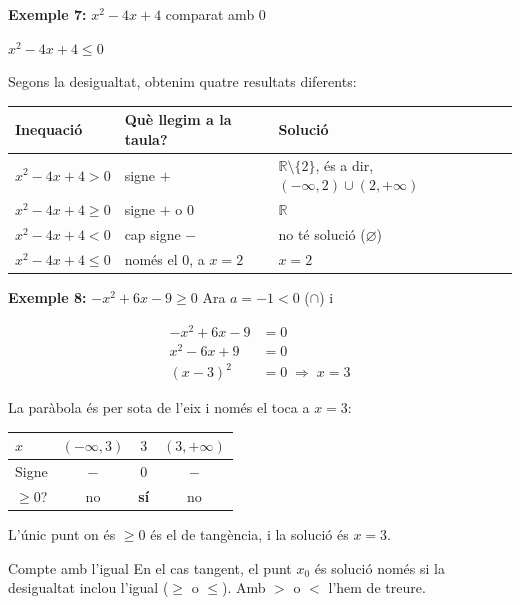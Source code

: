 \begin{exemple}{\textbf{Exemple 7:} $x^2-4x+4$ comparat amb $0$}
\begin{center}
\begin{minipage}[t]{0.48\linewidth}
$x^2-4x+4\leq 0$
\end{minipage}
\end{center}

Segons la desigualtat, obtenim quatre resultats diferents:

\begin{center}
\begin{tabular}{lll}
\toprule
\textbf{Inequació} & \textbf{Què llegim a la taula?} & \textbf{Solució} \\
\midrule
${x^2-4x+4>0}$ & signe $+$ & ${\mathbb{R}\setminus\{2\}}$, és a dir, $(-\infty,2)\cup(2,+\infty)$ \\
${x^2-4x+4\geq 0}$ & signe $+$ o $0$ & $\mathbb{R}$ \\
${x^2-4x+4<0}$ & cap signe $-$ & no té solució ($\varnothing$) \\
${x^2-4x+4\leq 0}$ & només el $0$, a $x=2$ & $x=2$ \\
\bottomrule
\end{tabular}
\end{center}
\end{exemple}

\begin{exemple}{\textbf{Exemple 8:} $-x^2+6x-9\geq 0$}
Ara $a=-1<0$ ($\cap$) i

\[
\begin{aligned}
-x^2+6x-9&=0\\
x^2-6x+9&=0\\
(x-3)^2&=0 \;\Rightarrow\; x=3
\end{aligned}
\]

La paràbola és per sota de l'eix i només el toca a $x=3$:

\begin{center}
\begin{tabular}{lccc}
\toprule
$x$ & $(-\infty,3)$ & $3$ & $(3,+\infty)$ \\
\midrule
Signe & $-$ & $0$ & $-$ \\
$\geq 0$? & no & \textbf{sí} & no \\
\bottomrule
\end{tabular}
\end{center}

L'únic punt on és $\geq 0$ és el de tangència, i la solució és $x=3$.
\end{exemple}

\begin{nota}{Compte amb l'igual}
En el cas tangent, el punt $x_0$ és solució només si la desigualtat inclou l'igual ($\geq$ o $\leq$). Amb $>$ o $<$ l'hem de treure.
\end{nota}

